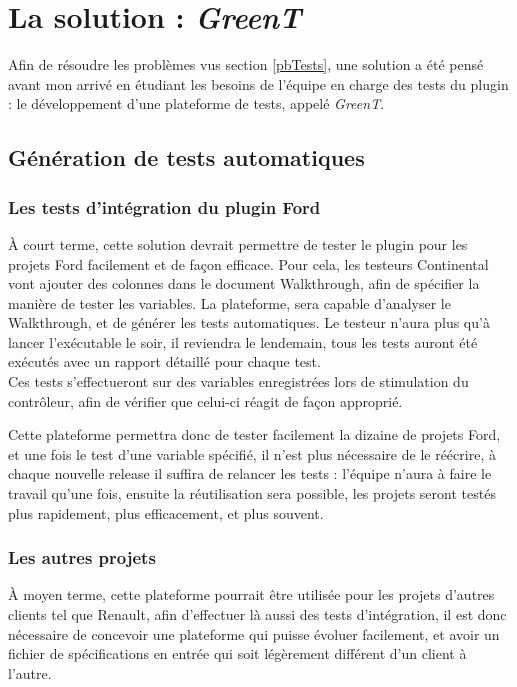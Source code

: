 	\section{La solution : \textit{\textit{GreenT}}}
	Afin de résoudre les problèmes vus section \ref{pbTests}, une solution a été pensé avant mon arrivé en étudiant les besoins de l'équipe en charge des tests du plugin : le développement d'une plateforme de tests, appelé \textit{GreenT}.

	\subsection{Génération de tests automatiques}
	\subsubsection{Les tests d'intégration du plugin Ford}
	À court terme, cette solution devrait permettre de tester le plugin pour les projets Ford facilement et de façon efficace. Pour cela, les testeurs Continental vont ajouter des colonnes dans le document Walkthrough, afin de spécifier la manière de tester les variables. La plateforme, sera capable d'analyser le Walkthrough, et de générer les tests automatiques. Le testeur n'aura plus qu'à lancer l'exécutable le soir, il reviendra le lendemain, tous les tests auront été exécutés avec un rapport détaillé pour chaque test.\\

	Ces tests s'effectueront sur des variables enregistrées lors de stimulation du contrôleur, afin de vérifier que celui-ci réagit de façon approprié.

	Cette plateforme permettra donc de tester facilement la dizaine de projets Ford, et une fois le test d'une variable spécifié, il n'est plus nécessaire de le réécrire, à chaque nouvelle release il suffira de relancer les tests : l'équipe n'aura à faire le travail qu'une fois, ensuite la réutilisation sera possible, les projets seront testés plus rapidement, plus efficacement, et plus souvent.

	\subsubsection{Les autres projets}
	À moyen terme, cette plateforme pourrait être utilisée pour les projets d'autres clients tel que Renault, afin d'effectuer là aussi des tests d'intégration, il est donc nécessaire de concevoir une plateforme qui puisse évoluer facilement, et avoir un fichier de spécifications en entrée qui soit légèrement différent d'un client à l'autre.

